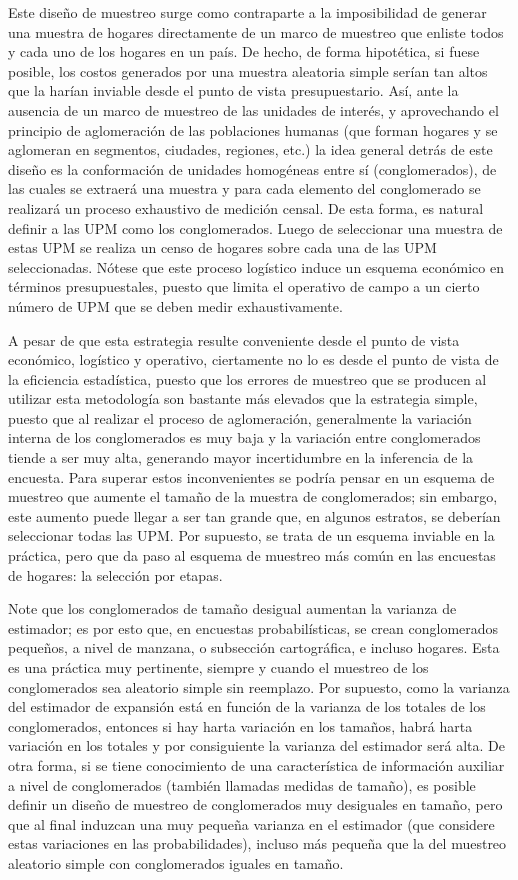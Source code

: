 \documentclass[
  12pt,
  spanish,
]{book}
\begin{document}
Este diseño de muestreo surge como contraparte a la imposibilidad de generar una muestra de hogares directamente de un marco de muestreo que enliste todos y cada uno de los hogares en un país. De hecho, de forma hipotética, si fuese posible, los costos generados por una muestra aleatoria simple serían tan altos que la harían inviable desde el punto de vista presupuestario. Así, ante la ausencia de un marco de muestreo de las unidades de interés, y aprovechando el principio de aglomeración de las poblaciones humanas (que forman hogares y se aglomeran en segmentos, ciudades, regiones, etc.) la idea general detrás de este diseño es la conformación de unidades homogéneas entre sí (conglomerados), de las cuales se extraerá una muestra y para cada elemento del conglomerado se realizará un proceso exhaustivo de medición censal. De esta forma, es natural definir a las UPM como los conglomerados. Luego de seleccionar una muestra de estas UPM se realiza un censo de hogares sobre cada una de las UPM seleccionadas. Nótese que este proceso logístico induce un esquema económico en términos presupuestales, puesto que limita el operativo de campo a un cierto número de UPM que se deben medir exhaustivamente.

A pesar de que esta estrategia resulte conveniente desde el punto de vista económico, logístico y operativo, ciertamente no lo es desde el punto de vista de la eficiencia estadística, puesto que los errores de muestreo que se producen al utilizar esta metodología son bastante más elevados que la estrategia simple, puesto que al realizar el proceso de aglomeración, generalmente la variación interna de los conglomerados es muy baja y la variación entre conglomerados tiende a ser muy alta, generando mayor incertidumbre en la inferencia de la encuesta. Para superar estos inconvenientes se podría pensar en un esquema de muestreo que aumente el tamaño de la muestra de conglomerados; sin embargo, este aumento puede llegar a ser tan grande que, en algunos estratos, se deberían seleccionar todas las UPM. Por supuesto, se trata de un esquema inviable en la práctica, pero que da paso al esquema de muestreo más común en las encuestas de hogares: la selección por etapas.

Note que los conglomerados de tamaño desigual aumentan la varianza de estimador; es por esto que, en encuestas probabilísticas, se crean conglomerados pequeños, a nivel de manzana, o subsección cartográfica, e incluso hogares. Esta es una práctica muy pertinente, siempre y cuando el muestreo de los conglomerados sea aleatorio simple sin reemplazo. Por supuesto, como la varianza del estimador de expansión está en función de la varianza de los totales de los conglomerados, entonces si hay harta variación en los tamaños, habrá harta variación en los totales y por consiguiente la varianza del estimador será alta. De otra forma, si se tiene conocimiento de una característica de información auxiliar a nivel de conglomerados (también llamadas medidas de tamaño), es posible definir un diseño de muestreo de conglomerados muy desiguales en tamaño, pero que al final induzcan una muy pequeña varianza en el estimador (que considere estas variaciones en las probabilidades), incluso más pequeña que la del muestreo aleatorio simple con conglomerados iguales en tamaño.
\end{document}
